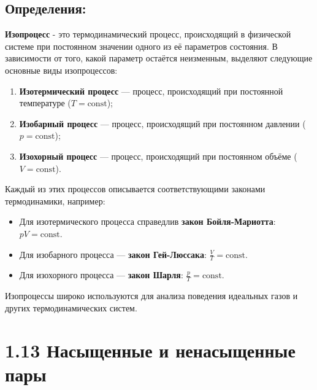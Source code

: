 \documentclass[a4paper,12pt]{article}
\begin{document}
\subsection*{Определения:}
\vspace{-3pt}
\textbf{Изопроцесс} - это термодинамический процесс, происходящий в физической системе при постоянном значении одного из её параметров состояния. В зависимости от того, какой параметр остаётся неизменным, выделяют следующие основные виды изопроцессов:
\begin{enumerate} 
    \item \textbf{Изотермический процесс} --- процесс, происходящий при постоянной температуре (\( T = \text{const} \));
    \item \textbf{Изобарный процесс} --- процесс, происходящий при постоянном давлении (\( p = \text{const} \));
    \item \textbf{Изохорный процесс} --- процесс, происходящий при постоянном объёме (\( V = \text{const} \)). 
\end{enumerate}
Каждый из этих процессов описывается соответствующими законами термодинамики, например:
\begin{itemize}
    \item Для изотермического процесса справедлив \textbf{закон Бойля-Мариотта}: \( pV = \text{const} \).
    \item Для изобарного процесса --- \textbf{закон Гей-Люссака}: \( \frac{V}{T} = \text{const} \).
    \item Для изохорного процесса --- \textbf{закон Шарля}: \( \frac{p}{T} = \text{const} \).
\end{itemize}
Изопроцессы широко используются для анализа поведения идеальных газов и других термодинамических систем.



\section*{1.13 Насыщенные и ненасыщенные пары}

\vspace{-9pt}
\end{document}
